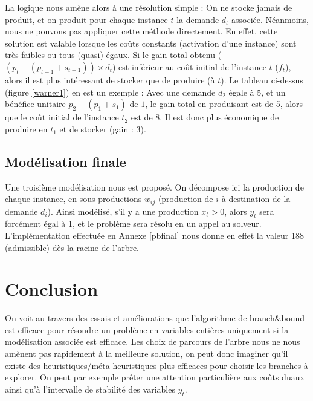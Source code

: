 \documentclass[a4paper,11pt,twoside]{report}
\begin{document}
La logique nous amène alors à une résolution simple : On ne stocke jamais de produit, et on produit pour chaque instance $t$ la demande $d_t$ associée. Néanmoins, nous ne pouvons pas appliquer cette méthode directement.
En effet, cette solution est valable lorsque les coûts constants (activation d'une instance) sont très faibles ou tous (quasi) égaux. Si le gain total obtenu ($(p_t-(p_{t-1}+s_{t-1}))\times d_t$) est inférieur au coût initial de l'instance $t$ ($f_t$), alors il est plus intéressant de stocker que de produire (à $t$).
Le tableau ci-dessus (figure \ref{warner1}) en est un exemple : Avec une demande $d_2$ égale à 5, et un bénéfice unitaire $p_2-(p_1+s_1)$ de $1$, le gain total en produisant est de 5, alors que le coût initial de l'instance $t_2$ est de 8. Il est donc plus économique de produire en $t_1$ et de stocker (gain : 3).

\section{Modélisation finale}
Une troisième modélisation nous est proposé. On décompose ici la production de chaque instance, en sous-productions $w_{ij}$ (production de $i$ à destination de la demande $d_i$).
Ainsi modélisé, s'il y a une production $x_t>0$, alors $y_t$ sera forcément égal à 1, et le problème sera résolu en un appel au solveur. L'implémentation effectuée en Annexe \ref{pbfinal} nous donne en effet la valeur 188 (admissible) dès la racine de l'arbre.

\chapter{Conclusion}
On voit au travers des essais et améliorations que l'algorithme de branch\&bound est efficace pour résoudre un problème en variables entières uniquement si la modélisation associée est efficace.
Les choix de parcours de l'arbre nous ne nous amènent pas rapidement à la meilleure solution, on peut donc imaginer qu'il existe des heuristiques/méta-heuristiques plus efficaces pour choisir les branches à explorer.
On peut par exemple prêter une attention particulière aux coûts duaux ainsi qu'à l'intervalle de stabilité des variables $y_t$.
\end{document}
